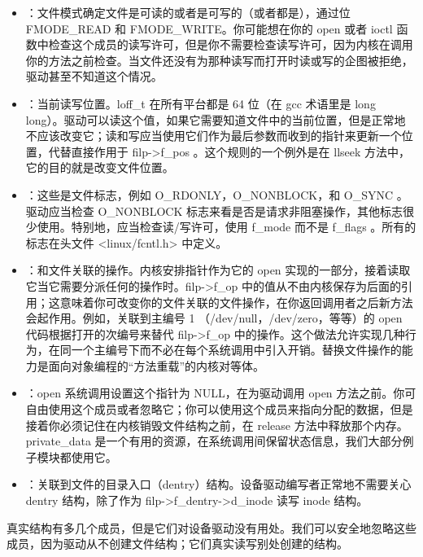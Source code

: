 \documentclass[lang=cn,newtx,10pt,scheme=chinese]{elegantbook}
\begin{document}
\begin{itemize}
    \item {}：文件模式确定文件是可读的或者是可写的（或者都是），通过位 FMODE\_READ 和 FMODE\_WRITE。你可能想在你的 open 或者 ioctl 函数中检查这个成员的读写许可，但是你不需要检查读写许可，因为内核在调用你的方法之前检查。当文件还没有为那种读写而打开时读或写的企图被拒绝，驱动甚至不知道这个情况。
    \item {}：当前读写位置。loff\_t 在所有平台都是 64 位（在 gcc 术语里是 long long）。驱动可以读这个值，如果它需要知道文件中的当前位置，但是正常地不应该改变它；读和写应当使用它们作为最后参数而收到的指针来更新一个位置，代替直接作用于 filp->f\_pos 。这个规则的一个例外是在 llseek 方法中，它的目的就是改变文件位置。
    \item {}：这些是文件标志，例如 O\_RDONLY，O\_NONBLOCK，和 O\_SYNC 。驱动应当检查 O\_NONBLOCK 标志来看是否是请求非阻塞操作，其他标志很少使用。特别地，应当检查读/写许可，使用 f\_mode 而不是 f\_flags 。所有的标志在头文件 <linux/fcntl.h> 中定义。
    \item {}：和文件关联的操作。内核安排指针作为它的 open 实现的一部分，接着读取它当它需要分派任何的操作时。filp->f\_op 中的值从不由内核保存为后面的引用；这意味着你可改变你的文件关联的文件操作，在你返回调用者之后新方法会起作用。例如，关联到主编号 1 （/dev/null，/dev/zero，等等）的 open 代码根据打开的次编号来替代 filp->f\_op 中的操作。这个做法允许实现几种行为，在同一个主编号下而不必在每个系统调用中引入开销。替换文件操作的能力是面向对象编程的``方法重载''的内核对等体。
    \item {}：open 系统调用设置这个指针为 NULL，在为驱动调用 open 方法之前。你可自由使用这个成员或者忽略它；你可以使用这个成员来指向分配的数据，但是接着你必须记住在内核销毁文件结构之前，在 release 方法中释放那个内存。private\_data 是一个有用的资源，在系统调用间保留状态信息，我们大部分例子模块都使用它。
    \item {}：关联到文件的目录入口（dentry）结构。设备驱动编写者正常地不需要关心 dentry 结构，除了作为 filp->f\_dentry->d\_inode 读写 inode 结构。
\end{itemize}

真实结构有多几个成员，但是它们对设备驱动没有用处。我们可以安全地忽略这些成员，因为驱动从不创建文件结构；它们真实读写别处创建的结构。
\end{document}
